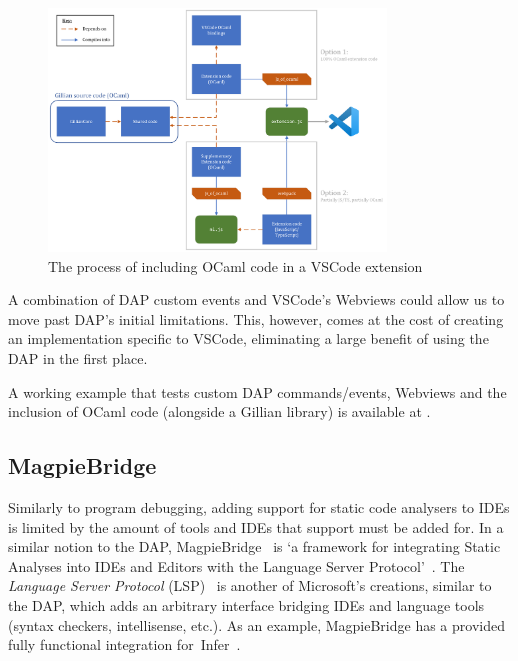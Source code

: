\begin{figure}
  \center
  \includegraphics[width=0.8\textwidth]{img/vscode-extension-with-ocaml.png}
  \caption{The process of including OCaml code in a VSCode extension}
  \label{fig:vscode-extension-with-ocaml}
\end{figure}

\label{sec:background:extending-dap}
A combination of DAP custom events and VSCode's Webviews could allow us to move
past DAP's initial limitations. This, however, comes at the cost of creating an
implementation specific to VSCode, eliminating a large benefit of using the DAP
in the first place.

A working example that tests custom DAP commands/events, Webviews and the
inclusion of OCaml code (alongside a Gillian library) is available at
\cite{debugger-experiment}.

\subsection{MagpieBridge}

Similarly to program debugging, adding support for static code analysers to IDEs
is limited by the amount of tools and IDEs that support must be added for. In a
similar notion to the DAP, MagpieBridge~\cite{magpiebridge} is `a framework for
integrating Static Analyses into IDEs and Editors with the Language Server
Protocol'~\cite{magpiebridge-repo}. The \textit{Language Server Protocol}
(LSP)~\cite{lsp} is another of Microsoft's creations, similar to the DAP, which
adds an arbitrary interface bridging IDEs and language tools (syntax checkers,
intellisense, etc.). As an example, MagpieBridge has a provided fully
functional integration for~Infer~\cite{infer-ide}.

